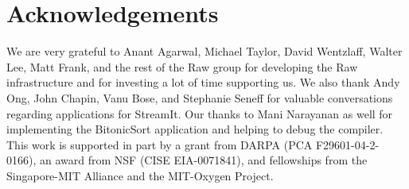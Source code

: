 \section{Acknowledgements}

We are very grateful to Anant Agarwal, Michael Taylor, David
Wentzlaff, Walter Lee, Matt Frank, and the rest of the Raw group for
developing the Raw infrastructure and for investing a lot of time
supporting us.  We also thank Andy Ong, John Chapin, Vanu Bose, and
Stephanie Seneff for valuable conversations regarding applications for
StreamIt.  Our thanks to Mani Narayanan as well for implementing the
BitonicSort application and helping to debug the compiler.  This work
is supported in part by a grant from DARPA (PCA F29601-04-2-0166), an
award from NSF (CISE EIA-0071841), and fellowships from the
Singapore-MIT Alliance and the MIT-Oxygen Project.
